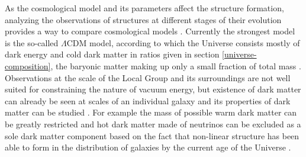 \documentclass[english, oneside]{HYgradu}
\begin{document}
As the cosmological model and its parameters affect the structure formation, analyzing the observations of structures at different stages of their evolution provides a way to compare cosmological models \citep{mo2010galaxy}. Currently the strongest model is the so-called $\Lambda$CDM model, according to which the Universe consists mostly of dark energy and cold dark matter in ratios given in section \ref{universe-composition}, the baryonic matter making up only a small fraction of total mass \citep{mo2010galaxy}. Observations at the scale of the Local Group and its surroundings are not well suited for constraining the nature of vacuum energy, but existence of dark matter can already be seen at scales of an individual galaxy and its properties of dark matter can be studied \citep{mo2010galaxy}. For example the mass of possible warm dark matter can be greatly restricted \citep{kennedy2014constraining} and hot dark matter made of neutrinos can be excluded as a sole dark matter component based on the fact that non-linear structure has been able to form in the distribution of galaxies by the current age of the Universe \citep{white1984is}.







\end{document}
